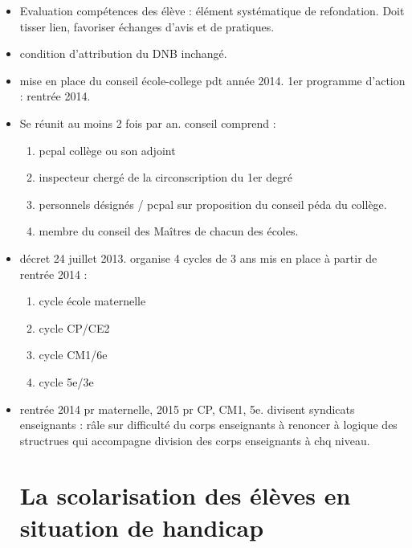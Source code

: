 \documentclass[12pt]{report}
\begin{document}
\begin{itemize}
\begin{enumerate}
\begin{enumerate}
\end{enumerate}
\end{enumerate}

\item Evaluation compétences des élève : élément systématique de refondation. Doit tisser lien, favoriser échanges d'avis et de pratiques. \\

\item condition d'attribution du DNB inchangé. \\

\item mise en place du conseil école-college pdt année 2014. 1er programme d'action : rentrée 2014. \\

\item Se réunit au moins 2 fois par an. conseil comprend : 
\begin{enumerate}
\item pcpal collège ou son adjoint
\item inspecteur chergé de la circonscription du 1er degré
\item personnels désignés / pcpal sur proposition du conseil péda du collège.
\item membre du conseil des Maîtres de chacun des écoles. \\
\end{enumerate}

\item décret 24 juillet 2013. organise 4 cycles de 3 ans mis en place à partir de rentrée 2014 : 
\begin{enumerate}
\item cycle école maternelle
\item cycle CP/CE2
\item cycle CM1/6e
\item cycle 5e/3e \\
\end{enumerate}

\item rentrée 2014 pr maternelle, 2015 pr CP, CM1, 5e. divisent syndicats enseignants : râle sur difficulté du corps enseignants à renoncer à logique des structrues qui accompagne division des corps enseignants à chq niveau. \\

\section{La scolarisation des élèves en situation de handicap}


\end{itemize}
\end{document}

